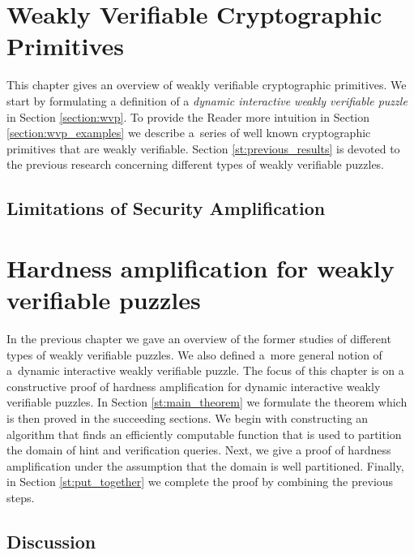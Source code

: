 \documentclass[11pt,a4paper,titlepage]{memoir}
\begin{document}
\chapter{Weakly Verifiable Cryptographic Primitives}
\label{ch:intro_weakly}
This chapter gives an overview of weakly verifiable cryptographic primitives.
We start by formulating a definition of a \textit{dynamic interactive weakly verifiable puzzle} in Section \ref{section:wvp}.
To provide the Reader more intuition in Section \ref{section:wvp_examples} we describe a~series of well known cryptographic primitives
that are weakly verifiable. Section \ref{st:previous_results} is devoted to the previous research concerning different types of weakly verifiable puzzles.
%



%
\section{Limitations of Security Amplification}
%
\chapter{Hardness amplification for weakly verifiable puzzles}
\label{ch:main_result}
In the previous chapter we gave an overview of the former studies of different types of weakly verifiable puzzles.
We also defined a~more general notion of a~dynamic interactive weakly verifiable puzzle.
The focus of this chapter is on a constructive proof of hardness amplification for dynamic interactive weakly verifiable puzzles.
In Section \ref{st:main_theorem} we formulate the theorem which is then proved in the succeeding sections.
We begin with constructing an algorithm that finds an efficiently computable function that is used
to partition the domain of hint and verification queries. Next, we give a proof of hardness amplification
under the assumption that the domain is well partitioned. Finally, in Section \ref{st:put_together}
we complete the proof by combining the previous steps.
%

%

%

%

%
\section{Discussion}
%
%
\appendix


\backmatter



\end{document}
